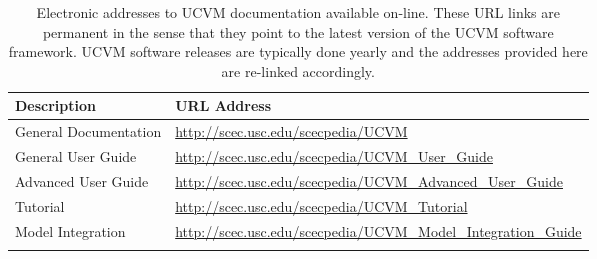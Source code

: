 
\begin{table*}[t]
\centering
\small
\caption{Electronic addresses to UCVM documentation available on-line. These URL links are permanent in the sense that they point to the latest version of the UCVM software framework. UCVM software releases are typically done yearly and the addresses provided here are re-linked accordingly.}
\begin{tabular}[]{ll}
Description                 & URL Address                                                         \\
\hline
General Documentation       & \url{http://scec.usc.edu/scecpedia/UCVM}                            \\
General User Guide          & \url{http://scec.usc.edu/scecpedia/UCVM_User_Guide}                 \\
Advanced User Guide         & \url{http://scec.usc.edu/scecpedia/UCVM_Advanced_User_Guide}        \\
Tutorial                    & \url{http://scec.usc.edu/scecpedia/UCVM_Tutorial}                   \\
Model Integration           & \url{http://scec.usc.edu/scecpedia/UCVM_Model_Integration_Guide}    \\
\hline
\\
\end{tabular}
\label{tab:manuals}
\end{table*}
